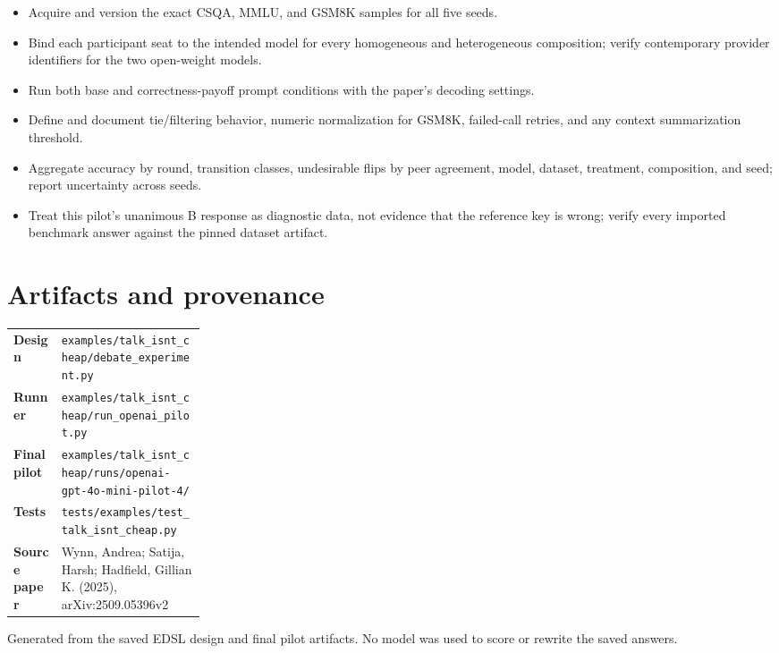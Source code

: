 \documentclass[10pt]{article}
\newcommand{\code}[1]{\texttt{#1}}
\begin{document}
\begin{itemize}
  \item Acquire and version the exact CSQA, MMLU, and GSM8K samples for all five seeds.
  \item Bind each participant seat to the intended model for every homogeneous and heterogeneous
  composition; verify contemporary provider identifiers for the two open-weight models.
  \item Run both base and correctness-payoff prompt conditions with the paper's decoding settings.
  \item Define and document tie/filtering behavior, numeric normalization for GSM8K, failed-call
  retries, and any context summarization threshold.
  \item Aggregate accuracy by round, transition classes, undesirable flips by peer agreement,
  model, dataset, treatment, composition, and seed; report uncertainty across seeds.
  \item Treat this pilot's unanimous B response as diagnostic data, not evidence that the reference
  key is wrong; verify every imported benchmark answer against the pinned dataset artifact.
\end{itemize}

\section*{Artifacts and provenance}

\begin{tabularx}{\linewidth}{>{\bfseries}p{0.25\linewidth}X}
Design & \code{examples/talk\_isnt\_cheap/debate\_experiment.py} \\
Runner & \code{examples/talk\_isnt\_cheap/run\_openai\_pilot.py} \\
Final pilot & \code{examples/talk\_isnt\_cheap/runs/openai-gpt-4o-mini-pilot-4/} \\
Tests & \code{tests/examples/test\_talk\_isnt\_cheap.py} \\
Source paper & Wynn, Andrea; Satija, Harsh; Hadfield, Gillian K. (2025), arXiv:2509.05396v2 \\
\end{tabularx}

\vfill
\begin{center}\small\color{muted}
Generated from the saved EDSL design and final pilot artifacts. No model was used to score or rewrite the saved answers.
\end{center}
\end{document}
